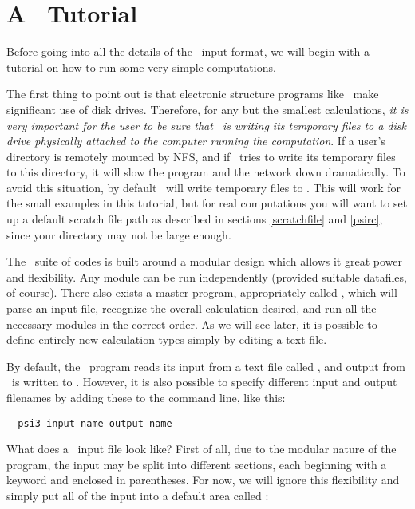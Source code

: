\section{A \PSIthree\ Tutorial} \label{tutorial}

Before going into all the details of the \PSIthree\ input format, 
we will begin with a tutorial on how to run some very simple 
computations.

The first thing to point out is that electronic structure programs
like \PSIthree\ make significant use of disk drives.  Therefore, 
for any but the smallest calculations, {\em it is very important for the user 
to be sure that \PSIthree\ is writing its temporary files to a 
disk drive physically attached to the computer running the computation}.
If a user's directory is remotely mounted by NFS, and if \PSIthree\
tries to write its temporary files to this directory, it will slow 
the program and the network down dramatically.  To avoid this
situation, by default \PSIthree\ will write temporary files to 
.  This will work for the small examples in this tutorial,
but for real computations you will want to set up a default scratch
file path as described in sections \ref{scratchfile} and \ref{psirc},
since your \file{/tmp} directory may not be large enough.

The \PSIthree\ suite of codes is built around a modular design which 
allows it great power and flexibility. Any module can be run 
independently (provided suitable datafiles, of course). There also exists a
master program, appropriately called \PSIdriver, which will parse 
an input file, recognize the overall calculation desired, 
and run all the necessary modules in the correct order.  As we will
see later, it is possible to define entirely new calculation types simply 
by editing a text file.

By default, the \PSIdriver\ program reads its input from a text file
called \inputdat, and output from \PSIthree\ is written to 
\outputdat.  However, it is also possible to specify different input
and output filenames by adding these to the command line, like this:
\begin{verbatim}
  psi3 input-name output-name
\end{verbatim}

What does a \PSIthree\ input file look like?  First of all, due to
the modular nature of the program, the input may be split into different
sections, each beginning with a keyword and enclosed in parentheses.
For now, we will ignore this flexibility and simply put all of the 
input into a default area called \keyword{psi}:

